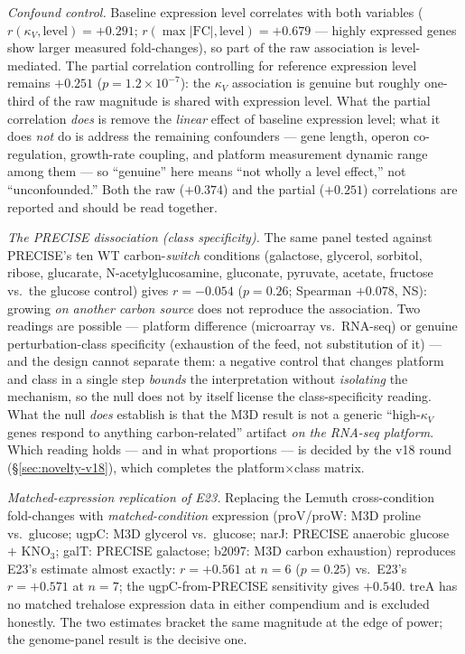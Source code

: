 \documentclass[11pt,a4paper]{article}
\theoremstyle{plain}
\theoremstyle{definition}
\theoremstyle{remark}
\begin{document}
\emph{Confound control.} Baseline expression level correlates with
both variables ($r(\kappa_V,\text{level}) = +0.291$;
$r(\max|\mathrm{FC}|,\text{level}) = +0.679$ --- highly expressed
genes show larger measured fold-changes), so part of the raw
association is level-mediated. The partial correlation controlling
for reference expression level remains $+0.251$
($p = 1.2 \times 10^{-7}$): the $\kappa_V$ association is genuine
but roughly one-third of the raw magnitude is shared with
expression level. What the partial correlation \emph{does} is remove
the \emph{linear} effect of baseline expression level; what it does
\emph{not} do is address the remaining confounders --- gene length,
operon co-regulation, growth-rate coupling, and platform measurement
dynamic range among them --- so ``genuine'' here means
``not wholly a level effect,'' not ``unconfounded.'' Both the raw
($+0.374$) and the partial ($+0.251$) correlations are reported and
should be read together.

\emph{The PRECISE dissociation (class specificity).} The same panel
tested against PRECISE's ten WT carbon-\emph{switch} conditions
(galactose, glycerol, sorbitol, ribose, glucarate,
N-acetylglucosamine, gluconate, pyruvate, acetate, fructose vs.\
the glucose control) gives $r = -0.054$ ($p = 0.26$; Spearman
$+0.078$, NS): growing \emph{on another carbon source} does not
reproduce the association. Two readings are possible --- platform
difference (microarray vs.\ RNA-seq) or genuine perturbation-class
specificity (exhaustion of the feed, not substitution of it) ---
and the design cannot separate them: a negative control that changes
platform and class in a single step \emph{bounds} the interpretation
without \emph{isolating} the mechanism, so the null does not by
itself license the class-specificity reading. What the null
\emph{does} establish is that the M3D result is not a generic
``high-$\kappa_V$ genes respond to anything carbon-related''
artifact \emph{on the RNA-seq platform}. Which reading holds --- and
in what proportions --- is decided by the v18 round
(\S\ref{sec:novelty-v18}), which completes the
platform$\times$class matrix.

\emph{Matched-expression replication of E23.} Replacing the Lemuth
cross-condition fold-changes with \emph{matched-condition}
expression (proV/proW: M3D proline vs.\ glucose; ugpC: M3D glycerol
vs.\ glucose; narJ: PRECISE anaerobic glucose $+$ KNO$_3$;
galT: PRECISE galactose; b2097: M3D carbon exhaustion) reproduces
E23's estimate almost exactly: $r = +0.561$ at $n = 6$
($p = 0.25$) vs.\ E23's $r = +0.571$ at $n = 7$; the
ugpC-from-PRECISE sensitivity gives $+0.540$. treA has no matched
trehalose expression data in either compendium and is excluded
honestly. The two estimates bracket the same magnitude at the edge
of power; the genome-panel result is the decisive one.
\end{document}
